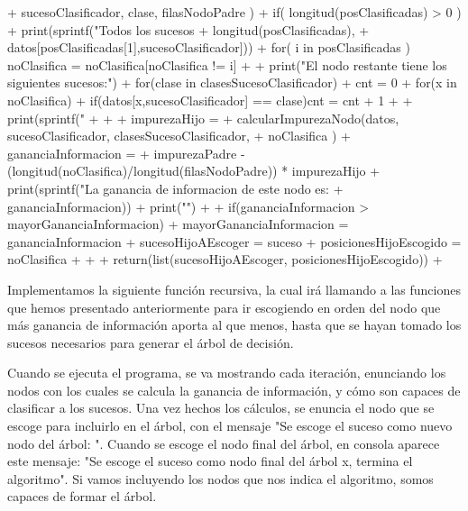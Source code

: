 \documentclass[parskip=full]{scrartcl}
\begin{document}
\begin{Schunk}
\begin{Sinput}
{{{+ 	  sucesoClasificador, clase, filasNodoPadre )
+       if( longitud(posClasificadas) > 0 ){ 
+ 	  print(sprintf("Todos los sucesos %
+ 	  longitud(posClasificadas), 
+ 		datos[posClasificadas[1],sucesoClasificador])) }
+       for( i in posClasificadas ){ noClasifica = noClasifica[noClasifica != i] }
+     }
+     print("El nodo restante tiene los siguientes sucesos:")
+     for(clase in clasesSucesoClasificador){ 
+       cnt = 0
+       for(x in noClasifica){
+         if(datos[x,sucesoClasificador] == clase){cnt = cnt + 1}
+       }
+       print(sprintf("%
+     }
+     
+     impurezaHijo = 
+ 	calcularImpurezaNodo(datos, sucesoClasificador, clasesSucesoClasificador,
+ 	noClasifica )
+     gananciaInformacion = 
+ 	impurezaPadre - (longitud(noClasifica)/longitud(filasNodoPadre)) * impurezaHijo
+     print(sprintf("La ganancia de informacion de este nodo es: %
+ 	gananciaInformacion))
+     print("")
+     
+     if(gananciaInformacion > mayorGananciaInformacion){ 
+       mayorGananciaInformacion = gananciaInformacion
+       sucesoHijoAEscoger = suceso
+       posicionesHijoEscogido = noClasifica
+     }
+   }
+   return(list(sucesoHijoAEscoger, posicionesHijoEscogido))
+ }
\end{Sinput}
\end{Schunk}


Implementamos la siguiente función recursiva, la cual irá llamando a las funciones que hemos presentado anteriormente para ir escogiendo en orden del nodo que más ganancia de información aporta al que menos, hasta que se hayan tomado los sucesos necesarios para generar el árbol de decisión. 

Cuando se ejecuta el programa, se va mostrando cada iteración, enunciando los nodos con los cuales se calcula la ganancia de información, y cómo son capaces de clasificar a los sucesos. Una vez hechos los cálculos, se enuncia el nodo que se escoge para incluirlo en el árbol, con el mensaje "Se escoge el suceso como nuevo nodo del árbol: ". Cuando se escoge el nodo final del árbol, en consola aparece este mensaje: "Se escoge el suceso como nodo final del árbol x, termina el algoritmo". Si vamos incluyendo los nodos que nos indica el algoritmo, somos capaces de formar el árbol.
\end{document}
